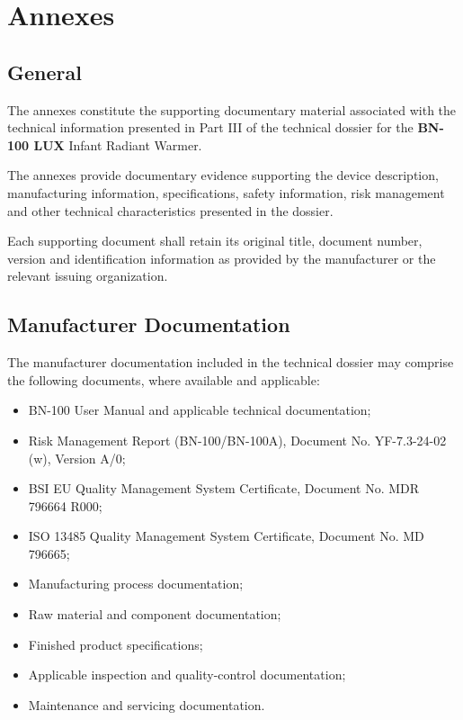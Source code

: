 

\hypertarget{p3-5}{}

\section{Annexes}

\subsection{General}

The annexes constitute the supporting documentary material associated
with the technical information presented in Part III of the technical
dossier for the \textbf{BN-100 LUX} Infant Radiant Warmer.

The annexes provide documentary evidence supporting the device
description, manufacturing information, specifications, safety
information, risk management and other technical characteristics
presented in the dossier.

Each supporting document shall retain its original title, document
number, version and identification information as provided by the
manufacturer or the relevant issuing organization.

\subsection{Manufacturer Documentation}

The manufacturer documentation included in the technical dossier may
comprise the following documents, where available and applicable:

\begin{itemize}

    \item BN-100 User Manual and applicable technical documentation;

    \item Risk Management Report (BN-100/BN-100A), Document No.
    YF-7.3-24-02 (w), Version A/0;

    \item BSI EU Quality Management System Certificate,
    Document No. MDR 796664 R000;

    \item ISO 13485 Quality Management System Certificate,
    Document No. MD 796665;

    \item Manufacturing process documentation;

    \item Raw material and component documentation;

    \item Finished product specifications;

    \item Applicable inspection and quality-control documentation;

    \item Maintenance and servicing documentation.

\end{itemize}

